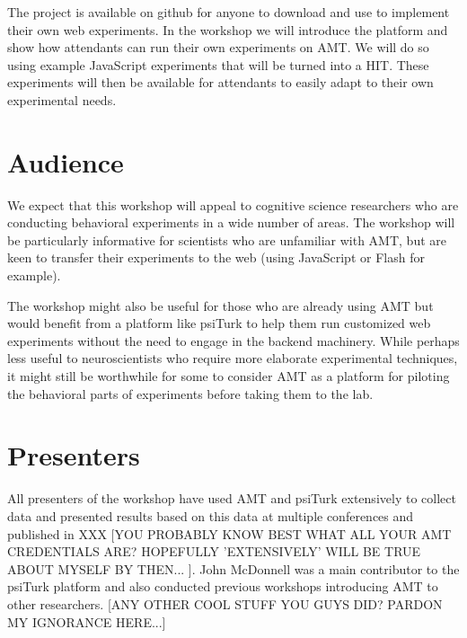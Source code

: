 \documentclass[10pt,letterpaper]{article}
\begin{document}
The project is available on github for anyone to download and use to implement their own web experiments.  In the workshop we will introduce the platform and show how attendants can run their own experiments on AMT. 
We will do so using example JavaScript experiments that will be turned into a HIT.
These experiments will then be available for attendants to easily adapt to their own experimental needs.


\section{Audience}
We expect that this workshop will appeal to cognitive science researchers who are conducting behavioral experiments in a wide number of areas. The workshop will be particularly informative for scientists who are unfamiliar with AMT, but are keen to transfer their experiments to  the web (using JavaScript or Flash for example). 

The workshop might also be useful for those who are already using AMT but would benefit from a platform like psiTurk to help them run customized web experiments without the need to engage in the backend machinery. While perhaps less useful to neuroscientists who  require more elaborate experimental techniques, it might still be worthwhile for some to consider AMT as a platform for piloting the behavioral parts of experiments before taking them to the lab.


\section{Presenters}

All presenters of the workshop have used AMT and psiTurk extensively to collect data and presented results based on this data at multiple conferences and published in XXX  [YOU PROBABLY KNOW BEST WHAT ALL YOUR AMT CREDENTIALS ARE? HOPEFULLY 'EXTENSIVELY' WILL BE TRUE ABOUT MYSELF BY THEN... ]. John McDonnell was a main contributor to the psiTurk platform and also conducted previous workshops introducing AMT to other researchers. [ANY OTHER COOL STUFF YOU GUYS DID? PARDON MY IGNORANCE HERE...]





\setlength{\bibleftmargin}{.125in}
\setlength{\bibindent}{-\bibleftmargin}



\todos
\end{document}
